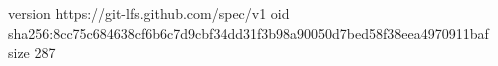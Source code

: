 version https://git-lfs.github.com/spec/v1
oid sha256:8cc75c684638cf6b6c7d9cbf34dd31f3b98a90050d7bed58f38eea4970911baf
size 287
